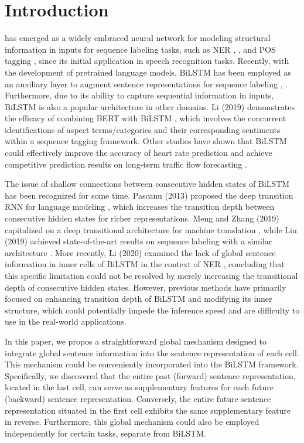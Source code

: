 \documentclass[lettersize,journal]{IEEEtran}
\begin{document}
\section{Introduction}
 \cite{schuster1997bidirectional} has emerged as a widely embraced neural network for modeling structural information in inputs for sequence labeling tasks, such as NER \cite{Ghaddar2018}, \cite{Ma2016}, and POS tagging \cite{Plank2016}, since its initial application in speech recognition tasks. Recently, with the development of pretrained language models, BiLSTM has been employed as an auxiliary layer to augment sentence representations for sequence labeling \cite{Chen2020}, \cite{Xu2021}. Furthermore, due to its ability to capture sequential information in inputs, BiLSTM is also a popular architecture in other domains. Li (2019)  demonstrates the efficacy of combining BERT with BiLSTM \cite{Li20192}, which involves the concurrent identifications of aspect terms/categories and their corresponding sentiments within a sequence tagging framework. Other studies have shown that BiLSTM could effectively improve the accuracy of heart rate prediction \cite{lin2023new} and achieve competitive prediction results on long-term traffic flow forecasting \cite{mendez2023long}.

The issue of shallow connections between consecutive hidden states of BiLSTM has been recognized for some time. Pascanu (2013) proposed the deep transition RNN for language modeling \cite{pascanu2013construct}, which increases the transition depth between consecutive hidden states for richer representations. Meng and Zhang (2019) capitalized on a deep transitional architecture for machine translation \cite{Meng2019}, while Liu (2019) achieved state-of-the-art results on sequence labeling with a similar architecture \cite{Liu2019}. More recently,  Li (2020) examined the lack of global sentence information in inner cells of BiLSTM in the context of NER \cite{Li2020}, concluding that this specific limitation could not be resolved by merely increasing the transitional depth of consecutive hidden states. However, previous methods have primarily focused on enhancing transition depth of BiLSTM and modifying its inner structure, which could potentially impede the inference speed and are difficulty to use in the real-world applications.

In this paper, we propos a straightforward global mechanism designed to integrate global sentence information into the sentence representation of each cell. This mechanism could be conveniently incorporated into the BiLSTM framework. Specifically, we discovered that the entire past (forward) sentence representation, located in the last cell, can serve as supplementary features for each future (backward) sentence representation. Conversely, the entire future sentence representation situated in the first cell exhibits the same supplementary feature in reverse. Furthermore, this global mechanism could also be employed independently for certain tasks, separate from BiLSTM.
\end{document}

